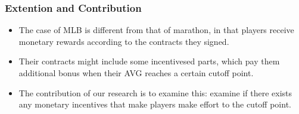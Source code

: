 \documentclass[dvipdfmx,12pt]{beamer}
\begin{document}
\begin{frame}\frametitle{Extention and Contribution}
\begin{itemize}
  \item The case of MLB is different from that of marathon, in that players receive monetary rewards according to the contracts they signed.

  \item Their contracts might include some incentivesed parts, which pay them additional bonus when their AVG reaches a certain cutoff point.

  \item The contribution of our research is to examine this: examine if there exists any monetary incentives that make players make effort to the cutoff point.
\end{itemize}
\end{frame}
\end{document}

